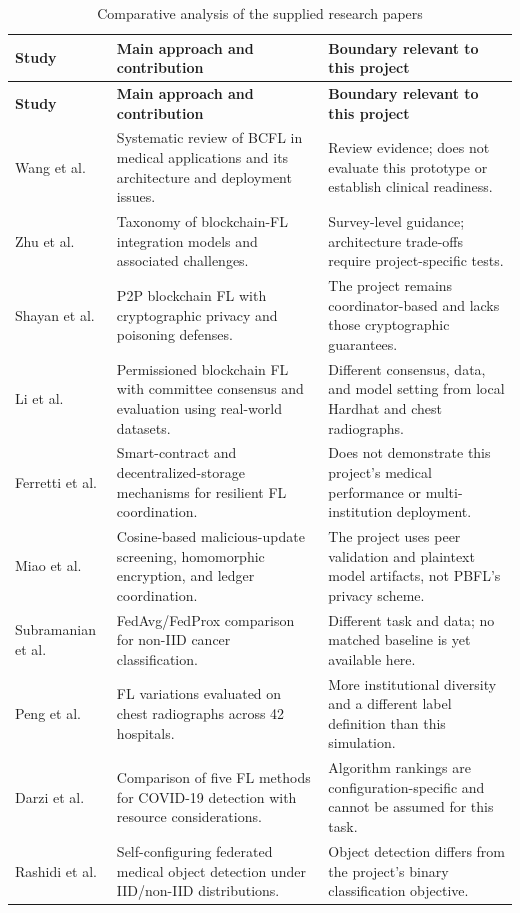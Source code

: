 \documentclass[12pt,a4paper]{report}
\begin{document}
\setlength{\tabcolsep}{4pt}
\singlespacing
\begin{longtable}{p{}p{}p{}}
\caption{Comparative analysis of the supplied research papers}\label{tab:literature-comparison}\\
\toprule
\textbf{Study} & \textbf{Main approach and contribution} & \textbf{Boundary relevant to this project} \\
\midrule
\endfirsthead
\toprule
\textbf{Study} & \textbf{Main approach and contribution} & \textbf{Boundary relevant to this project} \\
\midrule
\endhead
Wang et al. \cite{wang2026bcfl} & Systematic review of BCFL in medical applications and its architecture and deployment issues. & Review evidence; does not evaluate this prototype or establish clinical readiness. \\
Zhu et al. \cite{zhu2023blockfed} & Taxonomy of blockchain-FL integration models and associated challenges. & Survey-level guidance; architecture trade-offs require project-specific tests. \\
Shayan et al. \cite{shayan2021biscotti} & P2P blockchain FL with cryptographic privacy and poisoning defenses. & The project remains coordinator-based and lacks those cryptographic guarantees. \\
Li et al. \cite{li2021bflc} & Permissioned blockchain FL with committee consensus and evaluation using real-world datasets. & Different consensus, data, and model setting from local Hardhat and chest radiographs. \\
Ferretti et al. \cite{ferretti2025resilient} & Smart-contract and decentralized-storage mechanisms for resilient FL coordination. & Does not demonstrate this project's medical performance or multi-institution deployment. \\
Miao et al. \cite{miao2022pbfl} & Cosine-based malicious-update screening, homomorphic encryption, and ledger coordination. & The project uses peer validation and plaintext model artifacts, not PBFL's privacy scheme. \\
Subramanian et al. \cite{subramanian2022healthcare} & FedAvg/FedProx comparison for non-IID cancer classification. & Different task and data; no matched baseline is yet available here. \\
Peng et al. \cite{peng2023covid} & FL variations evaluated on chest radiographs across 42 hospitals. & More institutional diversity and a different label definition than this simulation. \\
Darzi et al. \cite{darzi2024covid} & Comparison of five FL methods for COVID-19 detection with resource considerations. & Algorithm rankings are configuration-specific and cannot be assumed for this task. \\
Rashidi et al. \cite{rashidi2024detection} & Self-configuring federated medical object detection under IID/non-IID distributions. & Object detection differs from the project's binary classification objective. \\
\bottomrule
\end{longtable}
\end{document}
